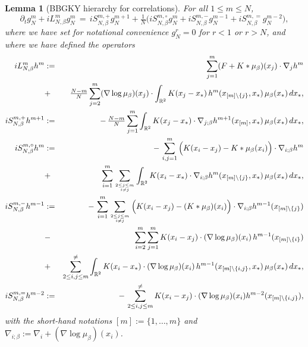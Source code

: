 \documentclass[a4paper,11pt,reqno,noindent]{amsart}
\theoremstyle{plain}
\newtheorem{lem}{Lemma}[section]
\numberwithin{equation}{section}
\newcommand{\R}{\mathbb R}
\newcommand{\3}{|\!|\!|}
\begin{document}
\begingroup\allowdisplaybreaks
\begin{lem}[BBGKY hierarchy for correlations]\label{lem:eqn-gNm-21}
For all $1\le m\le N$,
\begin{equation}\label{eq:eqn-gNm-21}
\partial_t g_N^m+iL_{N,\beta}^mg_N^m
\,=\,iS_{N,\beta}^{m,+}g_N^{m+1}+\tfrac1N\Big(iS_{N,\beta}^{m,\circ}g_N^{m}+iS_{N,\beta}^{m,-}g_N^{m-1}+iS_{N,\beta}^{m,=}g_N^{m-2}\Big),
\end{equation}
where we have set for notational  convenience $g^r_N=0$ for $r<1$ or $r>N$, and where we have defined the operators
\begin{eqnarray*}
iL_{N,\beta}^mh^m&:=&\sum_{j=1}^m(F+K\ast\mu_\beta)(x_j)\cdot\nabla_{j}h^{m}\\
&+&\tfrac{N-m}N\sum_{j=2}^m(\nabla\log\mu_\beta)(x_j)\cdot\int_{\R^2} K(x_j-x_*)\,h^{m}(x_{[m]\setminus\{j\}},x_*)\,\mu_\beta(x_*)\,dx_*,\\
iS_{N,\beta}^{m,+}h^{m+1}&:=&-\,\tfrac{N-m}N\sum_{j=1}^m\int_{\R^2} K(x_j-x_*)\cdot \nabla_{j;\beta}h^{m+1}(x_{[m]},x_*)\,\mu_\beta(x_*)\,dx_*,\\
iS_{N,\beta}^{m,\circ}h^{m}&:=&-\,\sum_{i,j=1}^m\Big(K(x_i-x_j)-K\ast\mu_\beta(x_i)\Big)\cdot\nabla_{i;\beta}h^m\\
&+&\sum_{i=1}^m\sum_{2\le j\le m\atop i\ne j}\int_{\R^2}K(x_i-x_*)\cdot\nabla_{i;\beta}h^{m}(x_{[m]\setminus\{j\}},x_*)\,\mu_\beta(x_*)\,dx_*,\\
iS_{N,\beta}^{m,-}h^{m-1}&:=&-\,\sum_{i=1}^m\sum_{2\le j\le m\atop i\ne j}\Big(K(x_i-x_j)-(K\ast\mu_\beta)(x_i)\Big)\cdot\nabla_{i;\beta}h^{m-1}(x_{[m]\setminus\{j\}})\\
&-&\sum_{i=2}^m\sum_{j=1}^mK(x_i-x_j)\cdot(\nabla\log\mu_\beta)(x_i)\,h^{m-1}(x_{[m]\setminus\{i\}})\\
&+&\sum_{2\le i,j\le m}^{\ne}\int_{\R^2} K(x_i-x_*)\cdot (\nabla\log\mu_\beta)(x_i)\,h^{m-1}(x_{[m]\setminus\{i,j\}},x_*)\,\mu_\beta(x_*)\,dx_*,\\
iS_{N,\beta}^{m,=}h^{m-2}&:=&-\,\sum_{2\le i,j\le m}^{\ne}K(x_i-x_j)\cdot(\nabla\log\mu_\beta)(x_i)h^{m-2}(x_{[m]\setminus\{i,j\}}),
\end{eqnarray*}
with the short-hand notations $[m]:=\{1,\ldots,m\}$ and $\nabla_{i;\beta}:=\nabla_i+(\nabla\log\mu_\beta)(x_i)$.
\end{lem}
\end{document}
